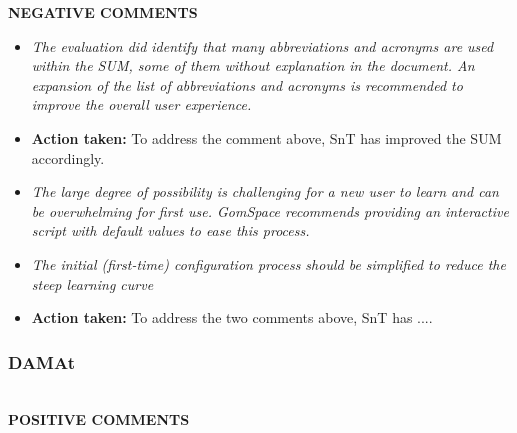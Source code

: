 \textbf{NEGATIVE COMMENTS} 

\begin{itemize}
\item \emph{The evaluation did identify that many abbreviations and acronyms are used within the SUM, some of them without explanation in the document. An expansion of the list of abbreviations and acronyms is recommended to improve the overall user experience.} 

\item \textbf{Action taken:} To address the comment above, SnT has improved the SUM accordingly.

\item \emph{The large degree of possibility is challenging for a new user to learn and can be overwhelming for first use. GomSpace recommends providing an interactive script with default values to ease this process.} 

\item \emph{The initial (first-time) configuration process should be simplified to reduce the steep learning curve} 

\item \textbf{Action taken:} To address the two comments above, SnT has .... 

\end{itemize}

\subsubsection{DAMAt} \ \\ 
 

 
\textbf{POSITIVE COMMENTS} 
 
